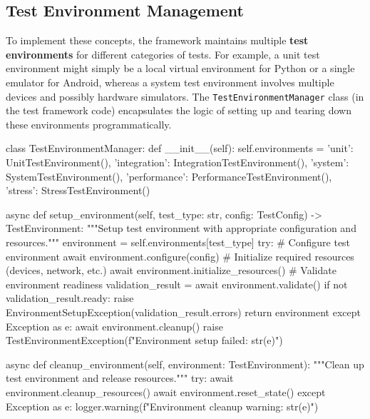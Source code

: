 \subsection{Test Environment Management}

To implement these concepts, the framework maintains multiple \textbf{test
environments} for different categories of tests. For example, a unit
test environment might simply be a local virtual environment for Python
or a single emulator for Android, whereas a system test environment
involves multiple devices and possibly hardware simulators. The
\texttt{TestEnvironmentManager} class (in the test framework code) encapsulates
the logic of setting up and tearing down these environments
programmatically.

    class TestEnvironmentManager:
        def __init__(self):
            self.environments = {
                'unit': UnitTestEnvironment(),
                'integration': IntegrationTestEnvironment(),
                'system': SystemTestEnvironment(),
                'performance': PerformanceTestEnvironment(),
                'stress': StressTestEnvironment()
            }

        async def setup_environment(self, test_type: str, config: TestConfig) -> TestEnvironment:
            """Setup test environment with appropriate configuration and resources."""
            environment = self.environments[test_type]
            try:
                # Configure test environment
                await environment.configure(config)
                # Initialize required resources (devices, network, etc.)
                await environment.initialize_resources()
                # Validate environment readiness
                validation_result = await environment.validate()
                if not validation_result.ready:
                    raise EnvironmentSetupException(validation_result.errors)
                return environment
            except Exception as e:
                await environment.cleanup()
                raise TestEnvironmentException(f"Environment setup failed: {str(e)}")

        async def cleanup_environment(self, environment: TestEnvironment):
            """Clean up test environment and release resources."""
            try:
                await environment.cleanup_resources()
                await environment.reset_state()
            except Exception as e:
                logger.warning(f"Environment cleanup warning: {str(e)}")

